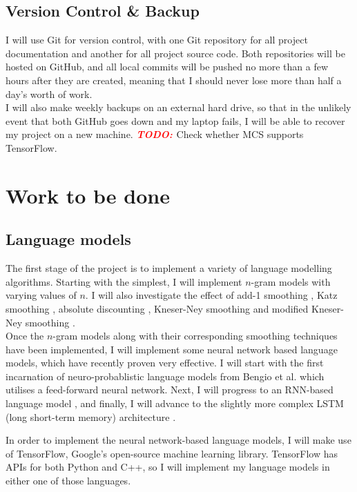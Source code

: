 \documentclass[a4paper, 12pt]{article}
\newcommand{\todo}{\textbf{\textit{\textcolor{red}{TODO: }}}}
\begin{document}
\subsection*{Version Control \& Backup}
I will use Git for version control, with one Git repository for all project documentation and another for all project source code. Both repositories will be hosted on GitHub, and all local commits will be pushed no more than a few hours after they are created, meaning that I should never lose more than half a day's worth of work. \\

\noindent
I will also make weekly backups on an external hard drive, so that in the unlikely event that both GitHub goes down and my laptop fails, I will be able to recover my project on a new machine. \todo{Check whether MCS supports TensorFlow.}

\section*{Work to be done}

\subsection*{Language models}
The first stage of the project is to implement a variety of language modelling algorithms. Starting with the simplest, I will implement $n$-gram models with varying values of $n$. I will also investigate the effect of add-1 smoothing \cite{add1}, Katz smoothing \cite{katz}, absolute discounting \cite{absdisc}, Kneser-Ney smoothing \cite{kneser} and modified Kneser-Ney smoothing \cite{modkneser}. \\

Once the $n$-gram models along with their corresponding smoothing techniques have been implemented, I will implement some neural network based language models, which have recently proven very effective. I will start with the first incarnation of neuro-probablistic language models from Bengio et al. \cite{bengio} which utilises a feed-forward neural network. Next, I will progress to an RNN-based language model \cite{mikolov}, and finally, I will advance to the slightly more complex LSTM (long short-term memory) architecture \cite{lstm}.

In order to implement the neural network-based language models, I will make use of TensorFlow, Google's open-source machine learning library. TensorFlow has APIs for both Python and C++, so I will implement my language models in either one of those languages.
\end{document}
